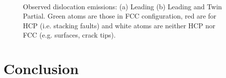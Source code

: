 \documentclass{article}
\begin{document}
\begin{figure}[H]%
\centering%
%
%
\\
\caption{Observed dislocation emissions: (a) Leading (b) Leading and Twin Partial.
Green atoms are those in FCC configuration, red are for HCP (i.e. stacking faults) and white atoms are neither HCP nor FCC (e.g. surfaces, crack tips).}
\label{fig:fracturedislocation_images}
\end{figure}


\section{Conclusion}
\end{document}
